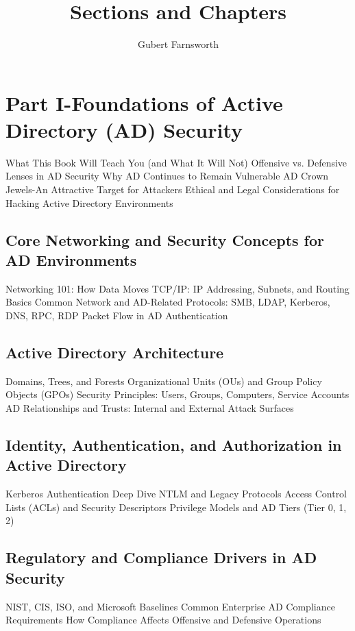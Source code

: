 \documentclass{article}
\title{Sections and Chapters}
\author{Gubert Farnsworth}
\date{ }
\begin{document}
\maketitle

\tableofcontents

\section{Part I-Foundations of Active Directory (AD) Security}

What This Book Will Teach You (and What It Will Not)
Offensive vs. Defensive Lenses in AD Security
Why AD Continues to Remain Vulnerable
AD Crown Jewels-An Attractive Target for Attackers
Ethical and Legal Considerations for Hacking Active Directory Environments

\subsection{Core Networking and Security Concepts for AD Environments}
Networking 101: How Data Moves
TCP/IP: IP Addressing, Subnets, and Routing Basics
Common Network and AD-Related Protocols: SMB, LDAP, Kerberos, DNS, RPC, RDP
Packet Flow in AD Authentication

\subsection{Active Directory Architecture}
Domains, Trees, and Forests
Organizational Units (OUs) and Group Policy Objects (GPOs)
Security Principles: Users, Groups, Computers, Service Accounts
AD Relationships and Trusts: Internal and External Attack Surfaces

\subsection{Identity, Authentication, and Authorization in Active Directory}
Kerberos Authentication Deep Dive
NTLM and Legacy Protocols
Access Control Lists (ACLs) and Security Descriptors
Privilege Models and AD Tiers (Tier 0, 1, 2)

\subsection{Regulatory and Compliance Drivers in AD Security}
NIST, CIS, ISO, and Microsoft Baselines
Common Enterprise AD Compliance Requirements
How Compliance Affects Offensive and Defensive Operations
\end{document}
